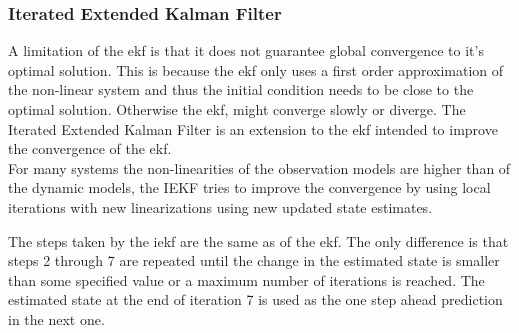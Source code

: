 \subsubsection{Iterated Extended Kalman Filter}
A limitation of the \gls{ekf} is that it does not guarantee global convergence to it's optimal solution. This is because the \gls{ekf} only uses a first order approximation of the non-linear system and thus the initial condition needs to be close to the optimal solution. Otherwise the \gls{ekf}, might converge slowly or diverge. The Iterated Extended Kalman Filter is an extension to the \gls{ekf} intended to improve the convergence of the \gls{ekf}.\\

For many systems the non-linearities of the observation models are higher than of the dynamic models, the IEKF tries to improve the convergence by using local iterations with new linearizations using new updated state estimates.

The steps taken by the \gls{iekf} are the same as of the \gls{ekf}. The only difference is that steps 2 through 7 are repeated until the change in the estimated state is smaller than some specified value or a maximum number of iterations is reached. The estimated state at the end of iteration 7 is used as the one step ahead prediction in the next one.

